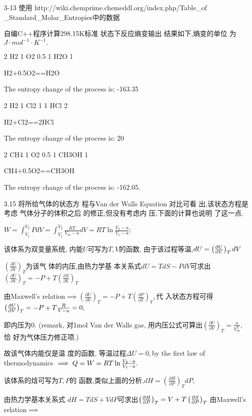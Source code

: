 \documentclass{article}
\begin{document}
3-13 使用 http://wiki.chemprime.chemeddl.org/index.php/Table\_of%
\_Standard\_Molar\_Entropies中的数据

自编C++程序计算298.15K标准%
状态下反应熵变输出%
结果如下,熵变的单位%
为 $\unit{J}\cdot \unit{mol}^{-1}\cdot \unit{K}^{-1}.$

2 H2 1 O2 0.5 1 H2O 1

H2+0.5O2==H2O

The entropy change of the process is: -163.35

2 H2 1 Cl2 1 1 HCl 2

H2+Cl2==2HCl

The entropy change of the process is: 20

2 CH4 1 O2 0.5 1 CH3OH 1

CH4+0.5O2==CH3OH

The entropy change of the process is: -162.05.

3.15 将所给气体的状态方%
程与Van der Walls Equation 对比可看%
出,该状态方程是考虑%
气体分子的体积之后%
的修正,但没有考虑内%
压,下面的计算也说明%
了这一点.

$W=\int_{V_{1}}^{V_{2}}PdV=\int_{V_{1}}^{V_{2}}\frac{RT}{V_{m}-a}dV=RT\ln 
\frac{V_{2}-a}{V_{1}-a};$

该体系为双变量系统,%
内能$U$可写为$T,V$的函数,%
由于该过程等温,$dU=\left( \frac{%
\partial U}{\partial V}\right) _{T}dV$

$\left( \frac{\partial U}{\partial V}\right) _{T}$为该气%
体的内压,由热力学基%
本关系式\qquad $dU=TdS-PdV$可求出$%
\left( \frac{\partial U}{\partial V}\right) _{T}=-P+T\left( \frac{\partial S%
}{\partial V}\right) _{T}$

由Maxwell's relation$\implies \left( \frac{\partial U}{\partial V}%
\right) _{T}=-P+T\left( \frac{\partial P}{\partial T}\right) _{V},$代%
入状态方程可得$\left( \frac{%
\partial U}{\partial V}\right) _{T}=-P+T\frac{R}{V-a}=0,$

即内压为0. (remark, 对1mol Van der Walls gas,%
用内压公式可算出$\left( 
\frac{\partial U}{\partial V}\right) _{T}=\frac{a}{V_{m}^{2}},$恰%
好为气体压力修正项.)

故该气体内能仅是温%
度的函数, 等温过程$\Delta
U=0,$by the first law of thermodynamics $\implies Q=W=RT\ln \frac{V_{2}-a}{%
V_{1}-a}.$

该体系的焓可写为$T,P$的%
函数,类似上面的分析,$%
dH=\left( \frac{\partial H}{\partial P}\right) _{T}dP,$

由热力学基本关系式%
\qquad $dH=TdS+VdP$可求出$\left( \frac{\partial H}{%
\partial P}\right) _{T}=V+T\left( \frac{\partial S}{\partial P}\right) _{T}$%
由Maxwell's relation$\implies $
\end{document}
